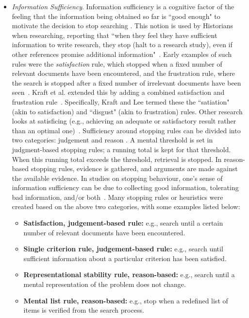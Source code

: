 \documentclass[10pt,oneside]{book}
\begin{document}
\begin{itemize}
    \item \emph{Information Sufficiency}. Information sufficiency is a cognitive factor of the feeling that the information being obtained so far is ``good enough" to motivate the decision to stop searching \cite{cooper_selecting_1973,prabha_what_2007,zach_when_2005,dostert_users_2009}. This notion is used by Historians when researching, reporting that ``when they feel they have sufficient information to write research, they stop (halt to a research study), even if other references promise additional information"~\cite{dalton_historians_2004}.
    Early examples of such rules were the \emph{satisfaction} rule, which stopped when a fixed number of relevant documents have been encountered, and the frustration rule, where the search is stopped after a fixed number of irrelevant documents have been seen~\cite{cooper_selecting_1973}. Kraft et al. extended this by adding a combined satisfaction and frustration rule~\cite{kraft_stopping_1979}. Specifically, Kraft and Lee termed these the ``satiation" (akin to satisfaction) and ``disgust" (akin to frustration) rules. Other research looks at satisficing (e.g., achieving an adequate or satisfactory result rather than an optimal one)~\cite{simon_behavioral_1955}. Sufficiency around stopping rules can be divided into two categories: judgement and reason \cite{nickles_judgment-based_1995, maxwell_modelling_2021}. A mental threshold is set in judgment-based stopping rules; a running total is kept for that threshold. When this running total exceeds the threshold, retrieval is stopped. In reason-based stopping rules, evidence is gathered, and arguments are made against the available evidence. In studies on stopping behaviour, one’s sense of information sufficiency can be due to collecting good information, tolerating bad information, and/or both~\cite{wu_how_2013}. Many stopping rules or heuristics were created based on the above two categories, with some examples listed below:

   \begin{itemize}
    \item \textbf{Satisfaction, judgement-based rule:} e.g., search until a certain number of relevant documents have been encountered.
    \item \textbf{Single criterion rule, judgement-based rule:} e.g., search until sufficient information about a particular criterion has been satisfied.
    \item \textbf{Representational stability rule, reason-based:} e.g., search until a mental representation of the problem does not change.
    \item \textbf{Mental list rule, reason-based:} e.g., stop when a redefined list of items is verified from the search process.
   \end{itemize}


\end{itemize}
\end{document}
